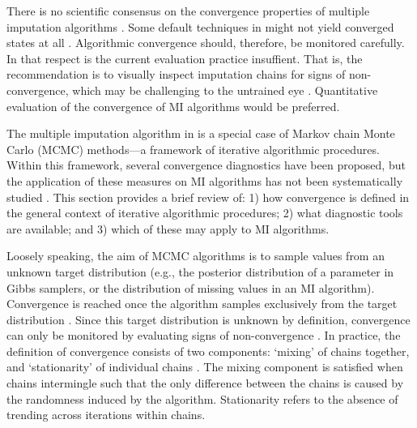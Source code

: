 \documentclass[article]{jss}
\begin{document}
There is no scientific consensus on the convergence properties of multiple imputation algorithms \citep{taka17}. Some default techniques in  might not yield converged states at all \citep{murr18}. Algorithmic convergence should, therefore, be monitored carefully. In that respect is the current evaluation practice insuffient. That is, the  recommendation is to visually inspect imputation chains for signs of non-convergence, which may be challenging to the untrained eye \citep[\S~6.5.2]{buur18}. Quantitative evaluation of the convergence of MI algorithms would be preferred.

The multiple imputation algorithm in  is a special case of Markov chain Monte Carlo (MCMC) methods---a framework of iterative algorithmic procedures. Within this framework, several convergence diagnostics have been proposed, but the application of these measures on MI algorithms has not been systematically studied \citep{buur18}.
This section provides a brief review of:%
1) how convergence is defined in the general context of iterative algorithmic procedures; 2) what diagnostic tools are available; and 3) which of these may apply to MI algorithms. 

Loosely speaking, the aim of MCMC algorithms is to sample values from an unknown target distribution (e.g., the posterior distribution of a parameter in Gibbs samplers, or the distribution of missing values in an MI algorithm). Convergence is reached once the algorithm samples exclusively from the target distribution \citep{cowl96}. Since this target distribution is unknown by definition, convergence can only be monitored by evaluating signs of non-convergence \citep{hoff09}. In practice, the definition of convergence consists of two components: `mixing' of chains together, and `stationarity' of individual chains \citep[p.~284]{gelm13}. The mixing component is satisfied when chains intermingle such that the only difference between the chains is caused by the randomness induced by the algorithm. Stationarity refers to the absence of trending across iterations within chains. %
\end{document}
